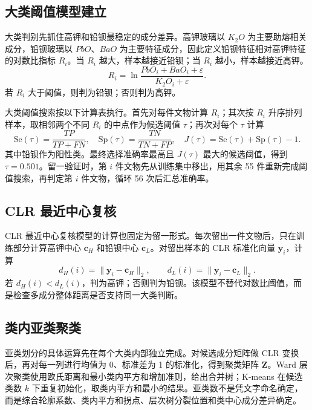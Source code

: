 \documentclass[UTF8,zihao=-4,a4paper,fontset=fandol]{ctexart}
\begin{document}
\subsection{大类阈值模型建立}

大类判别先抓住高钾和铅钡最稳定的成分差异。高钾玻璃以 $K_2O$ 为主要助熔相关成分，铅钡玻璃以 $PbO$、$BaO$ 为主要特征成分，因此定义铅钡特征相对高钾特征的对数比指标 $R_i$。当 $R_i$ 越大，样本越接近铅钡；当 $R_i$ 越小，样本越接近高钾。
\begin{equation}
  R_i=\ln\frac{PbO_i+BaO_i+\varepsilon}{K_2O_i+\varepsilon}.
  \label{eq:major-ratio}
\end{equation}
若 $R_i$ 大于阈值，则判为铅钡；否则判为高钾。

大类阈值搜索按以下计算表执行。首先对每件文物计算 $R_i$；其次按 $R_i$ 升序排列样本，取相邻两个不同 $R_i$ 的中点作为候选阈值 $\tau$；再次对每个 $\tau$ 计算
\begin{equation}
  \mathrm{Se}(\tau)=\frac{TP}{TP+FN},\quad
  \mathrm{Sp}(\tau)=\frac{TN}{TN+FP},\quad
  J(\tau)=\mathrm{Se}(\tau)+\mathrm{Sp}(\tau)-1.
  \label{eq:youden}
\end{equation}
其中铅钡作为阳性类。最终选择准确率最高且 $J(\tau)$ 最大的候选阈值，得到 $\tau=0.501$。留一验证时，第 $i$ 件文物先从训练集中移出，用其余 55 件重新完成阈值搜索，再判定第 $i$ 件文物，循环 56 次后汇总准确率。

\subsection{CLR 最近中心复核}

CLR 最近中心复核模型的计算也固定为留一形式。每次留出一件文物后，只在训练部分计算高钾中心 $\bm c_H$ 和铅钡中心 $\bm c_L$。对留出样本的 CLR 标准化向量 $\bm y_i$，计算
\begin{equation}
  d_H(i)=\|\bm y_i-\bm c_H\|_2,\qquad
  d_L(i)=\|\bm y_i-\bm c_L\|_2.
  \label{eq:nearest-center}
\end{equation}
若 $d_H(i)<d_L(i)$，判为高钾；否则判为铅钡。该模型不替代对数比阈值，而是检查多成分整体距离是否支持同一大类判断。

\subsection{类内亚类聚类}

亚类划分的具体运算先在每个大类内部独立完成。对候选成分矩阵做 CLR 变换后，再对每一列进行均值为 0、标准差为 1 的标准化，得到聚类矩阵 $\bm Z$。Ward 层次聚类使用欧氏距离和最小类内平方和增加准则，给出合并树；K-means 在候选类数 $k$ 下重复初始化，取类内平方和最小的结果。亚类数不是凭文字命名确定，而是综合轮廓系数、类内平方和拐点、层次树分裂位置和类中心成分差异确定。
\end{document}
